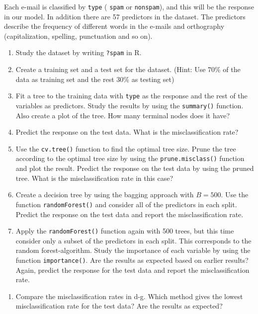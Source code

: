 \documentclass[
]{article}
\providecommand{\tightlist}{%
  \setlength{\itemsep}{0pt}\setlength{\parskip}{0pt}}
\begin{document}
Each e-mail is classified by \texttt{type} ( \texttt{spam} or
\texttt{nonspam}), and this will be the response in our model. In
addition there are 57 predictors in the dataset. The predictors describe
the frequency of different words in the e-mails and orthography
(capitalization, spelling, punctuation and so on).

\begin{enumerate}
\def\labelenumi{\alph{enumi})}
\item
  Study the dataset by writing \texttt{?spam} in R.
\item
  Create a training set and a test set for the dataset. (Hint: Use 70\%
  of the data as training set and the rest 30\% as testing set)
\item
  Fit a tree to the training data with \texttt{type} as the response and
  the rest of the variables as predictors. Study the results by using
  the \texttt{summary()} function. Also create a plot of the tree. How
  many terminal nodes does it have?
\item
  Predict the response on the test data. What is the misclassification
  rate?
\item
  Use the \texttt{cv.tree()} function to find the optimal tree size.
  Prune the tree according to the optimal tree size by using the
  \texttt{prune.misclass()} function and plot the result. Predict the
  response on the test data by using the pruned tree. What is the
  misclassification rate in this case?
\item
  Create a decision tree by using the bagging approach with \(B=500\).
  Use the function \texttt{randomForest()} and consider all of the
  predictors in each split. Predict the response on the test data and
  report the misclassification rate.
\item
  Apply the \texttt{randomForest()} function again with 500 trees, but
  this time consider only a subset of the predictors in each split. This
  corresponds to the random forest-algorithm. Study the importance of
  each variable by using the function \texttt{importance()}. Are the
  results as expected based on earlier results? Again, predict the
  response for the test data and report the misclassification rate.
\end{enumerate}

\begin{enumerate}
\def\labelenumi{\alph{enumi})}
\setcounter{enumi}{7}
\tightlist
\item
  Compare the misclassification rates in d-g. Which method gives the
  lowest misclassification rate for the test data? Are the results as
  expected?
\end{enumerate}
\end{document}
